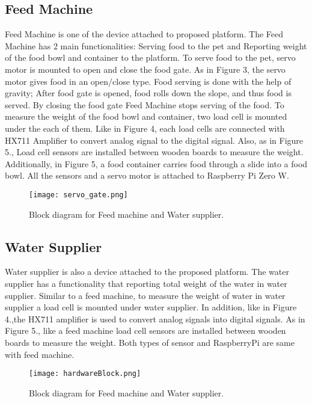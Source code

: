 \documentclass[conference]{IEEEtran}
\begin{document}
\subsection{Feed Machine}
Feed Machine is one of the device attached to proposed platform. The Feed Machine has 2 main functionalities: Serving food to the pet and Reporting weight of the food bowl and container to the platform. To serve food to the pet, servo motor is mounted to open and close the food gate. As in Figure 3, the servo motor gives food in an open/close type. Food serving is done with the help of gravity; After food gate is opened, food rolls down the slope, and thus food is served. By closing the food gate Feed Machine stops serving of the food. To measure the weight of the food bowl and container, two load cell is mounted under the each of them. Like in Figure 4, each load cells are connected with HX711 Amplifier to convert analog signal to the digital signal. Also, as in Figure 5., Load cell sensors are installed between wooden boards to measure the weight. Additionally, in Figure 5, a food container carries food through a slide into a food bowl. All the sensors and a servo motor is attached to Raspberry Pi Zero W.

\begin{figure}[htbp]
\centerline{\texttt{[image: servo\_gate.png]}}
\caption{Block diagram for Feed machine and Water supplier.}
\label{fig}
\end{figure}

\subsection{Water Supplier}
Water supplier is also a device attached to the proposed platform.
The water supplier has a functionality that reporting total weight of the water in water supplier.
Similar to a feed machine, to measure the weight of water in water supplier a load cell is mounted under water supplier. In addition, like in Figure 4.,the HX711 amplifier is used to convert analog signals into digital signals. As in Figure 5., like a feed machine load cell sensors are installed between wooden boards to measure the weight. Both types of sensor and RaspberryPi are same with feed machine. 

\begin{figure}[htbp]
\centerline{\texttt{[image: hardwareBlock.png]}}
\caption{Block diagram for Feed machine and Water supplier.}
\label{fig}
\end{figure}
\end{document}
